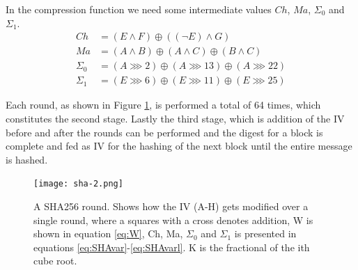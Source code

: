 \documentclass[a4paper, openany]{book}
\begin{document}
In the compression function we need some intermediate values \(Ch\), \(Ma\), \(\Sigma_0\) and \(\Sigma_1\).
\begin{align}\label{eq:SHAvar}
 Ch &= (E \wedge F) \oplus ((\neg E) \wedge G)\\
 Ma &= (A \wedge B) \oplus (A \wedge C) \oplus (B \wedge C)\\
 \Sigma_0 &= (A \ggg 2) \oplus (A \ggg 13) \oplus (A \ggg 22)\\
 \Sigma_1 &= (E \ggg 6) \oplus (E \ggg 11) \oplus (E \ggg 25)\label{eq:SHAvarl}
\end{align}

Each round, as shown in Figure \ref{fig:sha256round}, is performed a total of 64 times, which constitutes the second stage. Lastly the third stage, which is addition of the IV before and after the rounds can be performed and the digest for a block is complete and fed as IV for the hashing of the next block until the entire message is hashed.
\begin{figure}[H]
\centering
\captionsetup{width=.8\linewidth}
\texttt{[image: sha-2.png]}
\caption[A SHA256 round]%
{A SHA256 round. Shows how the IV (A-H) gets modified over a single round, where a squares with a cross denotes addition, W is shown in equation \ref{eq:W}, Ch, Ma, $\Sigma_0$ and $\Sigma_1$ is presented in equations \ref{eq:SHAvar}-\ref{eq:SHAvarl}. K is the fractional of the ith cube root.\cite{wiki:sha}
}
\label{fig:sha256round}
\end{figure}
\end{document}
